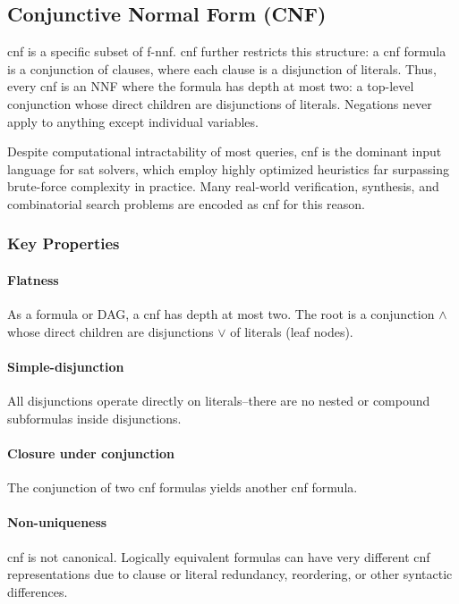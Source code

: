 \subsection{Conjunctive Normal Form (CNF)}
\acrfull{cnf} is a specific subset of \acrshort{f-nnf}. \acrshort{cnf} further restricts this structure: a \acrshort{cnf} formula is a conjunction of clauses, where each clause is a disjunction of literals. Thus, every \acrshort{cnf} is an NNF where the formula has depth at most two: a top-level conjunction whose direct children are disjunctions of literals. Negations never apply to anything except individual variables.

Despite computational intractability of most queries, \acrshort{cnf} is the dominant input language for \acrshort{sat} solvers, which employ highly optimized heuristics far surpassing brute-force complexity in practice. Many real-world verification, synthesis, and combinatorial search problems are encoded as \acrshort{cnf} for this reason.

\subsubsection{Key Properties}

\paragraph{Flatness}
As a formula or DAG, a \acrshort{cnf} has depth at most two. The root is a conjunction $\wedge$ whose direct children are disjunctions $\vee$ of literals (leaf nodes).

\paragraph{Simple-disjunction}
All disjunctions operate directly on literals--there are no nested or compound subformulas inside disjunctions.

\paragraph{Closure under conjunction}
The conjunction of two \acrshort{cnf} formulas yields another \acrshort{cnf} formula.

\paragraph{Non-uniqueness}
\acrshort{cnf} is not canonical. Logically equivalent formulas can have very different \acrshort{cnf} representations due to clause or literal redundancy, reordering, or other syntactic differences.

